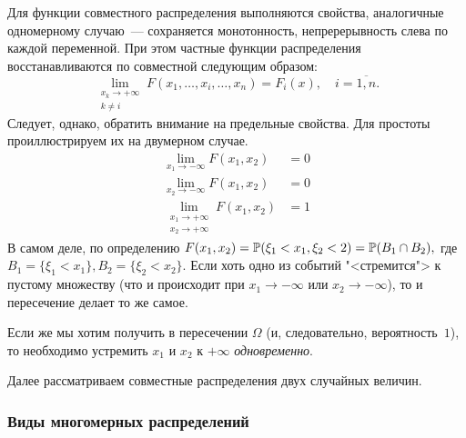 \begin{rmrk}
    Для функции совместного распределения выполняются свойства, аналогичные одномерному случаю~--- сохраняется монотонность, непререрывность слева по каждой переменной.
    При этом частные функции распределения восстанавливаются по совместной следующим образом:
    \begin{equation*}
        \lim\limits_{\substack{x_{k} \to +\infty \\ k \neq i}}  F(x_{1}, \ldots, x_{i}, \ldots, x_{n}) = F_{i}(x), \quad i = \overline{1,n}.
    \end{equation*}
    Следует, однако, обратить внимание на предельные свойства. 
    Для простоты проиллюстрируем их на двумерном случае.
    \begin{align*}
        \lim\limits_{x_1 \to -\infty} F(x_1, x_2) & = 0 \\
        \lim\limits_{x_2 \to -\infty} F(x_1, x_2) & = 0 \\
        \lim_{
            \substack{
                x_1 \to +\infty \\ 
                x_2 \to +\infty
            }
        } F(x_1, x_2) & = 1
    \end{align*}
    В самом деле, по определению $F(x_1, x_2) = \operatorname{\mathbb{P}}(\xi_1 < x_1, \xi_2 < 2) = \operatorname{\mathbb{P}}(B_1 \cap B_2),$ 
    где $B_1 = \{\xi_1 < x_1\}, B_2 = \{\xi_2 < x_2\}$. 
    Если хоть одно из событий "<стремится"> к пустому множеству (что и происходит при $x_1 \to -\infty$ или $x_2 \to -\infty$), 
    то и пересечение делает то же самое.

    Если же мы хотим получить в пересечении $\Omega$ (и, следовательно, вероятность~$1$), то необходимо устремить $x_1$ и $x_2$ к $+\infty$ \textit{одновременно}.
\end{rmrk}

Далее рассматриваем совместные распределения двух случайных величин.

\subsubsection{Виды многомерных распределений}


